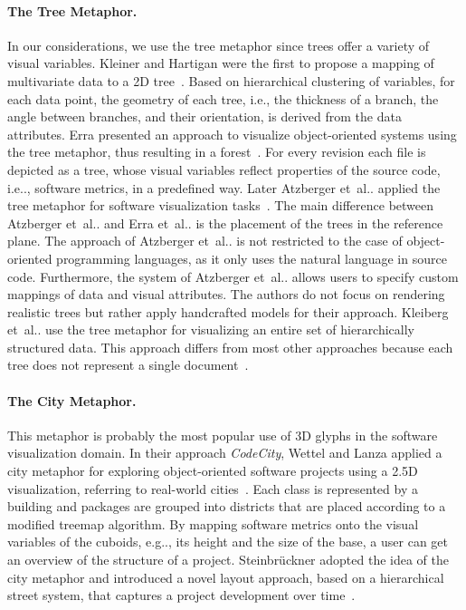 \documentclass[runningheads]{llncs}
\makeatletter
\DeclareRobustCommand\onedot{\futurelet\@let@token\@onedot}
\def\@onedot{\ifx\@let@token.\else.\null\fi\xspace}
\def\etal{et~al\onedot}
\def\eg{e.g\onedot,\xspace}
\def\ie{i.e\onedot,\xspace}
\makeatother
\begin{document}
\paragraph{The Tree Metaphor.}
In our considerations, we use the tree metaphor since trees offer a variety of visual variables.
Kleiner and Hartigan were the first to propose a mapping of multivariate data to a 2D tree~\cite{kleiner1981representing}.
Based on hierarchical clustering of variables, for each data point, the geometry of each tree, i.e., the thickness of a branch, the angle between branches, and their orientation, is derived from the data attributes.
Erra presented an approach to visualize object-oriented systems using the tree metaphor, thus resulting in a forest~\cite{Erra2012CodeTrees,Erra2012ForestMetaphor}.
For every revision each file is depicted as a tree, whose visual variables reflect properties of the source code, \ie software metrics, in a predefined way.
Later Atzberger \etal applied the tree metaphor for software visualization tasks~\cite{atzberger2021softwareforest}.
The main difference between Atzberger \etal and Erra \etal is the placement of the trees in the reference plane.
The approach of Atzberger \etal is not restricted to the case of object-oriented programming languages, as it only uses the natural language in source code.
Furthermore, the system of Atzberger \etal allows users to specify custom mappings of data and visual attributes.
The authors do not focus on rendering realistic trees but rather apply handcrafted models for their approach.
Kleiberg \etal use the tree metaphor for visualizing an entire set of hierarchically structured data.
This approach differs from most other approaches because each tree does not represent a single document~\cite{kleiberg2001botanical}.

\paragraph{The City Metaphor.} 
This metaphor is probably the most popular use of 3D glyphs in the software visualization domain.
In their approach \emph{CodeCity}, Wettel and Lanza applied a city metaphor for exploring object-oriented software projects using a 2.5D visualization, referring to real-world cities~\cite{Wettel2007SoftwareCities,Wettel2008CodeCity}.
Each class is represented by a building and packages are grouped into districts that are placed according to a modified treemap algorithm.
By mapping software metrics onto the visual variables of the cuboids, \eg its height and the size of the base, a user can get an overview of the structure of a project.
Steinbrückner adopted the idea of the city metaphor and introduced a novel layout approach, based on a hierarchical street system, that captures a project development over time~\cite{Steinbrueckner2010RepresentingDevelopmentHistory,steinbruckner2013-evolution}.
\end{document}
